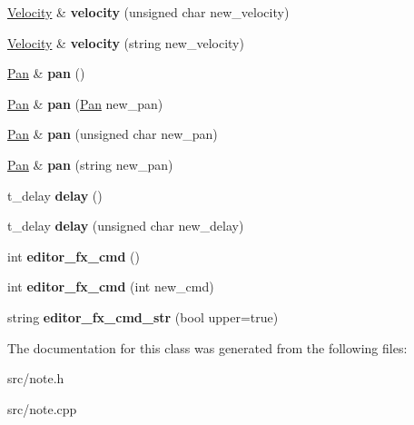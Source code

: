 \begin{DoxyCompactItemize}
\item 
\hyperlink{class_velocity}{Velocity} \& {\bfseries velocity} (unsigned char new\+\_\+velocity)\hypertarget{class_note_ac35d415fa1eaa13c57838c4810e93063}{}\label{class_note_ac35d415fa1eaa13c57838c4810e93063}

\item 
\hyperlink{class_velocity}{Velocity} \& {\bfseries velocity} (string new\+\_\+velocity)\hypertarget{class_note_a959cde07d893c189e449072af7081df8}{}\label{class_note_a959cde07d893c189e449072af7081df8}

\item 
\hyperlink{class_pan}{Pan} \& {\bfseries pan} ()\hypertarget{class_note_a111cd5c3feeb848b4d9d7f8bb9a02a4f}{}\label{class_note_a111cd5c3feeb848b4d9d7f8bb9a02a4f}

\item 
\hyperlink{class_pan}{Pan} \& {\bfseries pan} (\hyperlink{class_pan}{Pan} new\+\_\+pan)\hypertarget{class_note_a2672c42b5c3f5dce9e3e15dae3d38792}{}\label{class_note_a2672c42b5c3f5dce9e3e15dae3d38792}

\item 
\hyperlink{class_pan}{Pan} \& {\bfseries pan} (unsigned char new\+\_\+pan)\hypertarget{class_note_a5ad29b9b129a937a11db597df7f53bc5}{}\label{class_note_a5ad29b9b129a937a11db597df7f53bc5}

\item 
\hyperlink{class_pan}{Pan} \& {\bfseries pan} (string new\+\_\+pan)\hypertarget{class_note_a20513733789c2fb8f06629fe37ac2166}{}\label{class_note_a20513733789c2fb8f06629fe37ac2166}

\item 
t\+\_\+delay {\bfseries delay} ()\hypertarget{class_note_a39115029ff1c855fb946f16d8514a46c}{}\label{class_note_a39115029ff1c855fb946f16d8514a46c}

\item 
t\+\_\+delay {\bfseries delay} (unsigned char new\+\_\+delay)\hypertarget{class_note_a76c2eb5f13005c156e2d2b6a4213a359}{}\label{class_note_a76c2eb5f13005c156e2d2b6a4213a359}

\item 
int {\bfseries editor\+\_\+fx\+\_\+cmd} ()\hypertarget{class_note_ac58112c750da941b1d921c46b1ba91d3}{}\label{class_note_ac58112c750da941b1d921c46b1ba91d3}

\item 
int {\bfseries editor\+\_\+fx\+\_\+cmd} (int new\+\_\+cmd)\hypertarget{class_note_aed55dc8956e0d82a30faa527f196003c}{}\label{class_note_aed55dc8956e0d82a30faa527f196003c}

\item 
string {\bfseries editor\+\_\+fx\+\_\+cmd\+\_\+str} (bool upper=true)\hypertarget{class_note_a1e2bc3d3ce6c0349d5380c3a350a0051}{}\label{class_note_a1e2bc3d3ce6c0349d5380c3a350a0051}

\end{DoxyCompactItemize}


The documentation for this class was generated from the following files\+:\begin{DoxyCompactItemize}
\item 
src/note.\+h\item 
src/note.\+cpp\end{DoxyCompactItemize}
